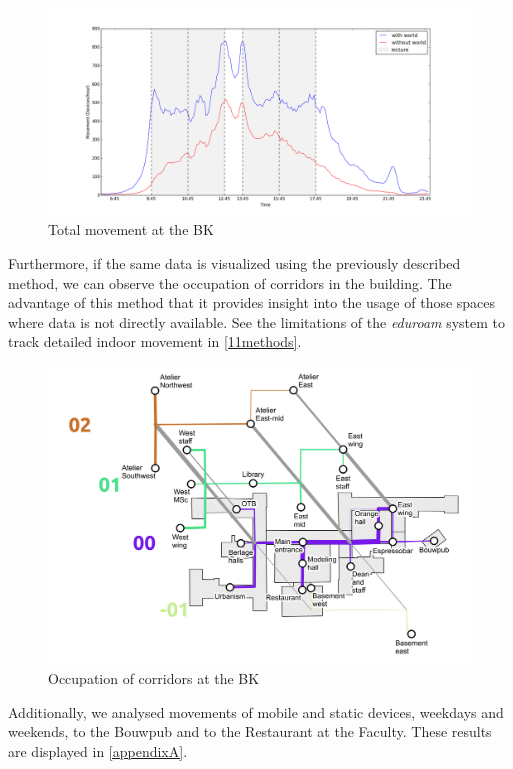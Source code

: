\begin{figure}[H]
\centering
\includegraphics[scale=0.35]{buildingpart_all_graph.png}
\captionsetup{justification=centering}
\caption{Total movement at the BK}
\label{figure:bk_total}
\end{figure}

Furthermore, if the same data is visualized using the previously described
method, we can observe the occupation of corridors in the building. The
advantage of this method that it provides insight into the usage of those
spaces where data is not directly available. See the limitations of the
\textit{eduroam} system to track detailed indoor movement in
\autoref{11methods}.

\begin{figure}[H]
\centering
\includegraphics[scale=0.56]{bk_map_total.png}
\captionsetup{justification=centering}
\caption{Occupation of corridors at the BK}
\label{map:bk_total}
\end{figure}

Additionally, we analysed movements of mobile and static devices, weekdays and
weekends, to the Bouwpub and to the Restaurant at the Faculty. These results are
displayed in \autoref{appendixA}.
